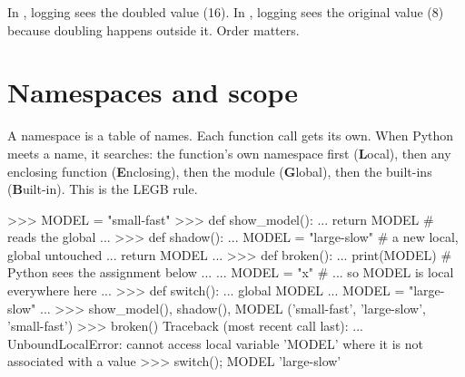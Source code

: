 In , logging sees the doubled value (16). In , logging sees the original value
(8) because doubling happens outside it. Order matters.

\section{Namespaces and scope}

A namespace is a table of names. Each function call gets its own. When Python meets a name, it
searches: the function's own namespace first (\textbf{L}ocal), then any enclosing function
(\textbf{E}nclosing), then the module (\textbf{G}lobal), then the built-ins (\textbf{B}uilt-in).
This is the LEGB rule.

\begin{center}
\end{center}

\begin{pycode}
>>> MODEL = "small-fast"
>>> def show_model():
...     return MODEL                 # reads the global
...
>>> def shadow():
...     MODEL = "large-slow"         # a new local, global untouched
...     return MODEL
...
>>> def broken():
...     print(MODEL)                 # Python sees the assignment below ...
...     MODEL = "x"                  # ... so MODEL is local everywhere here
...
>>> def switch():
...     global MODEL
...     MODEL = "large-slow"
...
>>> show_model(), shadow(), MODEL
('small-fast', 'large-slow', 'small-fast')
>>> broken()
Traceback (most recent call last):
  ...
UnboundLocalError: cannot access local variable 'MODEL' where it is not
associated with a value
>>> switch(); MODEL
'large-slow'
\end{pycode}

